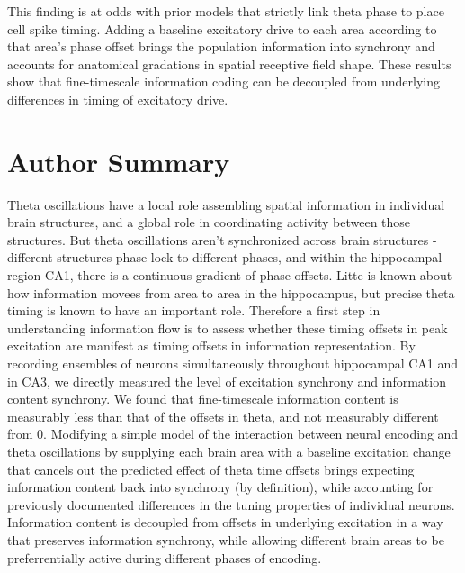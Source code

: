 \documentclass[10pt]{article}
\begin{document}
This finding is at odds with prior models that strictly link theta phase to place cell spike timing. Adding a baseline excitatory drive to each area according to that area's phase offset brings the population information into synchrony and accounts for anatomical gradations in spatial receptive field shape.  These results show that fine-timescale information coding can be decoupled from underlying differences in timing of excitatory drive.

\section*{Author Summary}
Theta oscillations have a local role assembling spatial information in individual brain structures, and a global role in coordinating activity between those structures.  But theta oscillations aren't synchronized across brain structures - different structures phase lock to different phases, and within the hippocampal region CA1, there is a continuous gradient of phase offsets.  Litte is known about how information movees from area to area in the hippocampus, but precise theta timing is known to have an important role.  Therefore a first step in understanding information flow is to assess whether these timing offsets in peak excitation are manifest as timing offsets in information representation.  By recording ensembles of neurons simultaneously throughout hippocampal CA1 and in CA3, we directly measured the level of excitation synchrony and information content synchrony.  We found that fine-timescale information content is measurably less than that of the offsets in theta, and not measurably different from 0.  Modifying a simple model of the interaction between neural encoding and theta oscillations by supplying each brain area with a baseline excitation change that cancels out the predicted effect of theta time offsets brings expecting information content back into synchrony (by definition), while accounting for previously documented differences in the tuning properties of individual neurons.  Information content is decoupled from offsets in underlying excitation in a way that preserves information synchrony, while allowing different brain areas to be preferrentially active during different phases of encoding.
\end{document}
